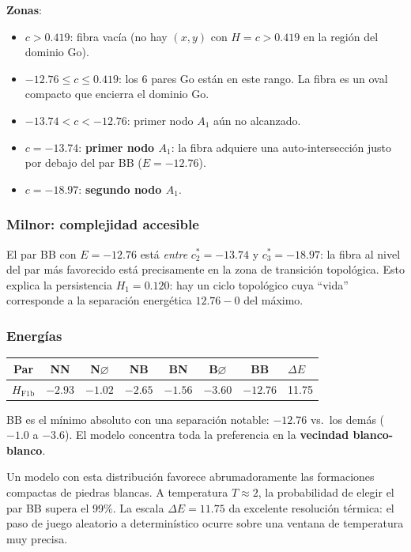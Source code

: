 \documentclass[11pt,a4paper]{article}
\newcommand{\dE}{\Delta E}
\begin{document}
\textbf{Zonas}:
\begin{itemize}[noitemsep]
  \item $c > 0.419$: fibra vacía (no hay $(x,y)$ con $H=c>0.419$
        en la región del dominio Go).
  \item $-12.76 \leq c \leq 0.419$: los 6 pares Go están en este rango.
        La fibra es un oval compacto que encierra el dominio Go.
  \item $-13.74 < c < -12.76$: primer nodo $A_1$ aún no alcanzado.
  \item $c = -13.74$: \textbf{primer nodo $A_1$}: la fibra adquiere una
        auto-intersección justo por debajo del par BB ($E=-12.76$).
  \item $c = -18.97$: \textbf{segundo nodo $A_1$}.
\end{itemize}

\subsubsection*{Milnor: complejidad accesible}

El par BB con $E=-12.76$ está \emph{entre} $c^*_2=-13.74$ y
$c^*_3=-18.97$: la fibra al nivel del par más favorecido está
precisamente en la zona de transición topológica.
Esto explica la persistencia $H_1=0.120$: hay un ciclo topológico
cuya ``vida'' corresponde a la separación energética $12.76-0$ del máximo.

\subsubsection*{Energías}

\begin{center}
\begin{tabular}{ccccccc}
  \toprule
  Par & NN & N$\varnothing$ & NB & BN & B$\varnothing$ & BB & $\dE$ \\
  \midrule
  $H_{\text{F1b}}$ & $-2.93$ & $-1.02$ & $-2.65$ & $-1.56$ & $-3.60$ & $-12.76$ & 11.75 \\
  \bottomrule
\end{tabular}
\end{center}

BB es el mínimo absoluto con una separación notable: $-12.76$ vs.\ los demás
($-1.0$ a $-3.6$). El modelo concentra toda la preferencia en la
\textbf{vecindad blanco-blanco}.

\begin{tcolorbox}[notebox,title={Lectura estratégica y temperatura}]
Un modelo con esta distribución favorece abrumadoramente las formaciones
compactas de piedras blancas. A temperatura $T\approx 2$, la probabilidad de
elegir el par BB supera el 99\%. La escala $\dE=11.75$ da excelente
resolución térmica: el paso de juego aleatorio a determinístico ocurre
sobre una ventana de temperatura muy precisa.
\end{tcolorbox}
\end{document}
